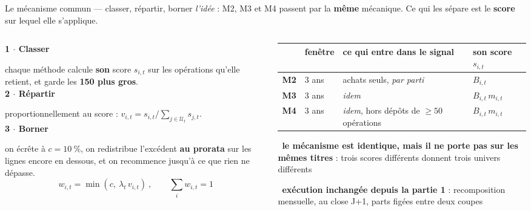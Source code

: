 \documentclass[11pt,aspectratio=169]{beamer}
\newcommand{\et}[2]{{\color{bleu}\bfseries #1 $\cdot$ #2}\par\vspace{0.6mm}}
\newcommand{\obs}[1]{{\color{bleu}\scriptsize\textbullet}~{\scriptsize #1}\par\vspace{0.4mm}}
\newcommand{\lire}[1]{{\scriptsize\color{grisf}#1}}
\begin{document}
\begin{frame}{Le mécanisme commun --- classer, répartir, borner}
  \lire{\emph{l'idée} : M2, M3 et M4 passent par la \textbf{même} mécanique. Ce qui les sépare est
   le \textbf{score} sur lequel elle s'applique.}
  \par\vspace{2.5mm}
  \begin{columns}[T]
    \begin{column}{0.44\textwidth}
      \et{1}{Classer}
      {\scriptsize chaque méthode calcule \textbf{son} score $s_{i,t}$ sur les opérations
       qu'elle retient, et garde les \textbf{150 plus gros}.}\\[2mm]
      \et{2}{Répartir}
      {\scriptsize proportionnellement au score :
       $v_{i,t} = s_{i,t} / \sum_{j \in \mathcal U_t} s_{j,t}$.}\\[2mm]
      \et{3}{Borner}
      {\scriptsize on écrête à $c = 10~\%$, on redistribue l'excédent \textbf{au prorata} sur les
       lignes encore en dessous, et on recommence jusqu'à ce que rien ne dépasse.}
      \vspace{-1mm}
      {\footnotesize\[ \boxed{\ w_{i,t} = \min(c,\ \lambda_t\, v_{i,t})\ },
         \qquad \sum_i w_{i,t} = 1 \]}
    \end{column}
    \begin{column}{0.53\textwidth}
      {\scriptsize\setlength{\tabcolsep}{5pt}\setlength{\extrarowheight}{2.5pt}
      \begin{tabular}{@{}l l >{\raggedright\arraybackslash}p{3.3cm} l@{}}
        \toprule
        & fenêtre & ce qui entre dans le signal & son score $s_{i,t}$\\
        \midrule
        \textbf{M2} & 3 ans & achats seuls, \emph{par parti} & $B_{i,t}$\\
        \textbf{M3} & 3 ans & \emph{idem} & $B_{i,t}\,m_{i,t}$\\
        \textbf{M4} & 3 ans & \emph{idem}, hors dépôts de $\geq 50$ opérations & $B_{i,t}\,m_{i,t}$\\
        \bottomrule
      \end{tabular}}\par\vspace{3mm}
      \obs{\textbf{le mécanisme est identique, mais il ne porte pas sur les mêmes titres} : trois
       scores différents donnent trois univers différents}
      \vspace{1.5mm}
      \obs{\textbf{exécution inchangée depuis la partie 1} : recomposition mensuelle, au close
       J+1, parts figées entre deux coupes}
    \end{column}
  \end{columns}
\end{frame}
\end{document}
